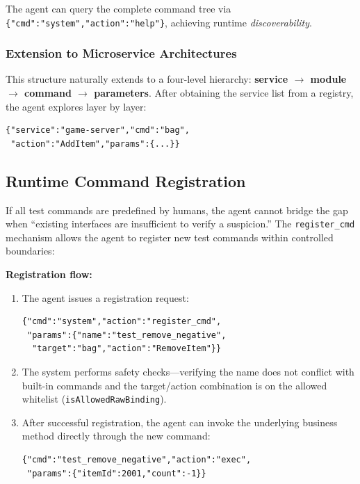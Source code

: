 \documentclass[sigconf,nonacm]{acmart}
\begin{document}
The agent can query the complete command tree via \texttt{\{"cmd":"system","action":"help"\}}, achieving runtime \emph{discoverability}.

\subsubsection{Extension to Microservice Architectures}

This structure naturally extends to a four-level hierarchy: \textbf{service $\to$ module $\to$ command $\to$ parameters}. After obtaining the service list from a registry, the agent explores layer by layer:

\begin{lstlisting}
{"service":"game-server","cmd":"bag",
 "action":"AddItem","params":{...}}
\end{lstlisting}

\subsection{Runtime Command Registration}

If all test commands are predefined by humans, the agent cannot bridge the gap when ``existing interfaces are insufficient to verify a suspicion.'' The \texttt{register\_cmd} mechanism allows the agent to register new test commands within controlled boundaries:

\textbf{Registration flow:}

\begin{enumerate}
\item The agent issues a registration request:
\begin{lstlisting}
{"cmd":"system","action":"register_cmd",
 "params":{"name":"test_remove_negative",
  "target":"bag","action":"RemoveItem"}}
\end{lstlisting}
\item The system performs safety checks---verifying the name does not conflict with built-in commands and the target/action combination is on the allowed whitelist (\texttt{isAllowedRawBinding}).
\item After successful registration, the agent can invoke the underlying business method directly through the new command:
\begin{lstlisting}
{"cmd":"test_remove_negative","action":"exec",
 "params":{"itemId":2001,"count":-1}}
\end{lstlisting}
\end{enumerate}
\end{document}
